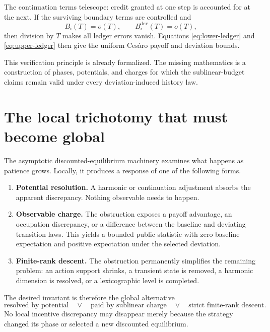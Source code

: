 \documentclass[11pt]{article}
\newcommand{\littleo}{o}
\begin{document}
The continuation terms telescope: credit granted at one step is accounted
for at the next.  If the surviving boundary terms are controlled and
\[
  B_i(T)=\littleo(T),
  \qquad
  B_i^{\mathrm{dev}}(T)=\littleo(T),
\]
then division by \(T\) makes all ledger errors vanish.  Equations
\eqref{eq:lower-ledger} and \eqref{eq:upper-ledger} then give the uniform
Ces\`aro payoff and deviation bounds.

This verification principle is already formalized.  The missing mathematics
is a construction of phases, potentials, and charges for which the
sublinear-budget claims remain valid under every deviation-induced history
law.

\section{The local trichotomy that must become global}

The asymptotic discounted-equilibrium machinery examines what happens as
patience grows.  Locally, it produces a response of one of the following
forms.

\begin{enumerate}
  \item \textbf{Potential resolution.}
        A harmonic or continuation adjustment absorbs the apparent
        discrepancy.  Nothing observable needs to happen.

  \item \textbf{Observable charge.}
        The obstruction exposes a payoff advantage, an occupation
        discrepancy, or a difference between the baseline and deviating
        transition laws.  This yields a bounded public statistic with zero
        baseline expectation and positive expectation under the selected
        deviation.

  \item \textbf{Finite-rank descent.}
        The obstruction permanently simplifies the remaining problem: an
        action support shrinks, a transient state is removed, a harmonic
        dimension is resolved, or a lexicographic level is completed.
\end{enumerate}

The desired invariant is therefore the global alternative
\[
  \boxed{
    \text{resolved by potential}
    \quad\lor\quad
    \text{paid by sublinear charge}
    \quad\lor\quad
    \text{strict finite-rank descent}.
  }
\]
No local incentive discrepancy may disappear merely because the strategy
changed its phase or selected a new discounted equilibrium.
\end{document}
